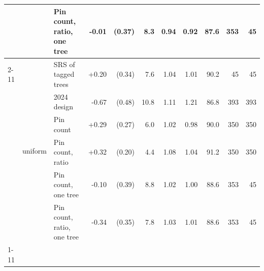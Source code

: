 \begin{tabular}{lll|rr|r|rr|r|rr}
 &  & Pin count, ratio, one tree & -0.01 & (0.37) & 8.3 & 0.94 & 0.92 & 87.6 & 353 & 45 \\
\cline{2-11}
 & \multirow[t]{6}{*}{uniform} & SRS of tagged trees & +0.20 & (0.34) & 7.6 & 1.04 & 1.01 & 90.2 & 45 & 45 \\
 &  & 2024 design & -0.67 & (0.48) & 10.8 & 1.11 & 1.21 & 86.8 & 393 & 393 \\
 &  & Pin count & +0.29 & (0.27) & 6.0 & 1.02 & 0.98 & 90.0 & 350 & 350 \\
 &  & Pin count, ratio & +0.32 & (0.20) & 4.4 & 1.08 & 1.04 & 91.2 & 350 & 350 \\
 &  & Pin count, one tree & -0.10 & (0.39) & 8.8 & 1.02 & 1.00 & 88.6 & 353 & 45 \\
 &  & Pin count, ratio, one tree & -0.34 & (0.35) & 7.8 & 1.03 & 1.01 & 88.6 & 353 & 45 \\
\cline{1-11} \cline{2-11}
\bottomrule
\end{tabular}
